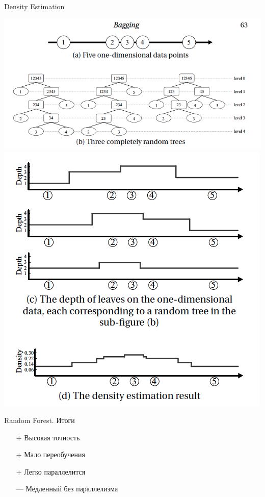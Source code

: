 \documentclass[10pt,a4paper]{beamer}
\begin{document}
\begin{frame}{Density Estimation}

\begin{center}
\includegraphics[scale=0.25]{images/de1.png}
\includegraphics[scale=0.25]{images/de2.png}
\end{center}

\end{frame}


\begin{frame}{Random Forest. Итоги}

\begin{itemize}
\item[+] Высокая точность
\item[+] Мало переобучения
\item[+] Легко параллелится
\item[---] Медленный без параллелизма
\end{itemize}

\end{frame}
\end{document}
